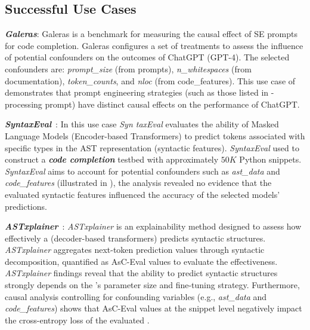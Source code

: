 \subsection{Successful Use Cases}\label{sec:cases}
\textit{\textbf{Galeras}}\cite{galeras}: Galeras is a benchmark for measuring the causal effect of SE prompts for code completion. Galeras configures a set of treatments to assess the influence of potential confounders on the outcomes of ChatGPT (\ie GPT-4). The selected confounders are: \textit{prompt\_size} (from prompts), \textit{n\_whitespaces} (from documentation), \textit{token\_counts}, and \textit{nloc} (from code\_features). This use case of \snipgen demonstrates that prompt engineering strategies (such as those listed in  - processing prompt) have distinct causal effects on the performance of ChatGPT.


\textit{\textbf{SyntaxEval}}~\cite{syntax_capabilities}: In this use case \textit{Syn taxEval} evaluates the ability of Masked Language Models (\ie Encoder-based Transformers) to predict tokens associated with specific types in the AST representation (\ie syntactic features). \textit{SyntaxEval} used \snipgen to construct a \textbf{\textit{code completion}} testbed with approximately $50K$ Python snippets. \textit{SyntaxEval} aims to account for potential confounders such as \textit{ast\_data} and \textit{code\_features} (illustrated in ), the analysis revealed no evidence that the evaluated syntactic features influenced the accuracy of the selected models' predictions.

\textit{\textbf{ASTxplainer}}~\cite{astexplainer}: \textit{ASTxplainer} is an explainability method designed to assess how effectively a \llm (\eg decoder-based transformers) predicts syntactic structures. \textit{ASTxplainer} aggregates next-token prediction values through syntactic decomposition, quantified as AsC-Eval values to evaluate the effectiveness. \textit{ASTxplainer} findings reveal that the ability to predict syntactic structures strongly depends on the \llm's parameter size and fine-tuning strategy. Furthermore, causal analysis controlling for confounding variables (e.g., \textit{ast\_data} and \textit{code\_features}) shows that AsC-Eval values at the snippet level negatively impact the cross-entropy loss of the evaluated \llms.
